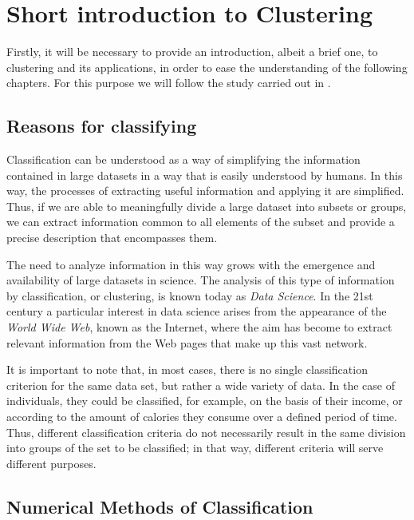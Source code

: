 
\chapter{Short introduction to Clustering}\label{ch:Breve introducción al Clustering}

Firstly, it will be necessary to provide an introduction, albeit a brief one, to clustering and its applications, in order to ease the understanding of the following chapters. For this purpose we will follow the study carried out in \cite{Everitt:2009:CA:1538772}.

\section{Reasons for classifying}

Classification can be understood as a way of simplifying the information contained in large datasets in a way that is easily understood by humans. In this way, the processes of extracting useful information and applying it are simplified. Thus, if we are able to meaningfully divide a large dataset into subsets or groups, we can extract information common to all elements of the subset and provide a precise description that encompasses them.

The need to analyze information in this way grows with the emergence and availability of large datasets in science. The analysis of this type of information by classification, or clustering, is known today as \textit{Data Science}. In the 21st century a particular interest in data science arises from the appearance of the \textit{World Wide Web}, known as the Internet, where the aim has become to extract relevant information from the Web pages that make up this vast network.

It is important to note that, in most cases, there is no single classification criterion for the same data set, but rather a wide variety of data. In the case of individuals, they could be classified, for example, on the basis of their income, or according to the amount of calories they consume over a defined period of time. Thus, different classification criteria do not necessarily result in the same division into groups of the set to be classified; in that way, different criteria will serve different purposes.

\section{Numerical Methods of Classification}

